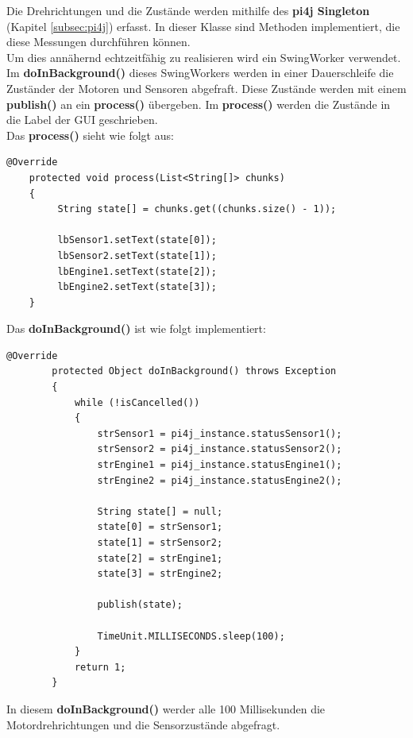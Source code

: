 Die Drehrichtungen und die Zustände werden mithilfe des \textbf{pi4j Singleton} (Kapitel \ref{subsec:pi4j}) erfasst. In dieser Klasse sind Methoden implementiert, die diese Messungen durchführen können.
\\ Um dies annähernd echtzeitfähig zu realisieren wird ein SwingWorker verwendet. Im \textbf{doInBackground()} dieses SwingWorkers werden in einer Dauerschleife die Zuständer der Motoren und Sensoren abgefraft. Diese Zustände werden mit einem \textbf{publish()} an ein \textbf{process()} übergeben. Im \textbf{process()} werden die Zustände in die Label der GUI geschrieben.
\\ Das \textbf{process()} sieht wie folgt aus:
\begin{lstlisting}[style=JavaStyle, caption= Label aktualisieren]
	@Override
    protected void process(List<String[]> chunks)
    {
         String state[] = chunks.get((chunks.size() - 1));
            
         lbSensor1.setText(state[0]);
         lbSensor2.setText(state[1]);
         lbEngine1.setText(state[2]);
         lbEngine2.setText(state[3]);
    } 
\end{lstlisting}
Das \textbf{doInBackground()} ist wie folgt implementiert:
\begin{lstlisting}[style=JavaStyle, caption= Motor- und Sensorzustände ]
	@Override
        protected Object doInBackground() throws Exception
        {                        
            while (!isCancelled())
            {
                strSensor1 = pi4j_instance.statusSensor1();
                strSensor2 = pi4j_instance.statusSensor2();
                strEngine1 = pi4j_instance.statusEngine1();
                strEngine2 = pi4j_instance.statusEngine2();
                
                String state[] = null;
                state[0] = strSensor1;
                state[1] = strSensor2;
                state[2] = strEngine1;
                state[3] = strEngine2;
                
                publish(state);
                
                TimeUnit.MILLISECONDS.sleep(100);
            } 
            return 1;            
        }

\end{lstlisting}
In diesem \textbf{doInBackground()} werder  alle 100 Millisekunden die Motordrehrichtungen und die Sensorzustände abgefragt.

\newpage

